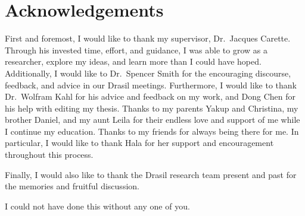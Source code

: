 \chapter{Acknowledgements}
\label{chap:acknowledgements}

First and foremost, I would like to thank my supervisor, Dr.\ Jacques Carette.
Through his invested time, effort, and guidance, I was able to grow as a
researcher, explore my ideas, and learn more than I could have hoped.
Additionally, I would like to Dr.\ Spencer Smith for the encouraging discourse,
feedback, and advice in our Drasil meetings. Furthermore, I would like to thank
Dr.\ Wolfram Kahl for his advice and feedback on my work, and Dong Chen for his
help with editing my thesis. Thanks to my parents Yakup and Christina, my
brother Daniel, and my aunt Leila for their endless love and support of me while
I continue my education. Thanks to my friends for always being there for me. In
particular, I would like to thank Hala for her support and encouragement
throughout this process. 

Finally, I would also like to thank the Drasil research team present and past
for the memories and fruitful discussion.

I could not have done this without any one of you.

